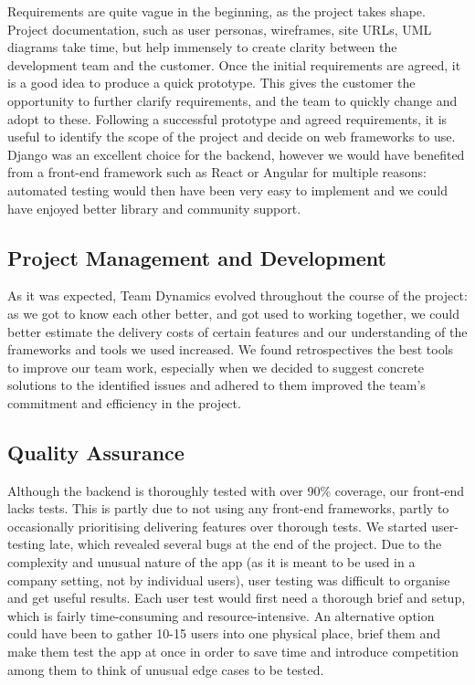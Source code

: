 \documentclass{l3proj}
\begin{document}
Requirements are quite vague in the beginning, as the project takes shape. Project documentation, such as user personas, wireframes, site URLs, UML diagrams take time, but help immensely to create clarity between the development team and the customer.
Once the initial requirements are agreed, it is a good idea to produce a quick prototype. This gives the customer the opportunity to further clarify requirements, and the team to quickly change and adopt to these. Following a successful prototype and agreed requirements, it is useful to identify the scope of the project and decide on web frameworks to use. Django was an excellent choice for the backend, however we would have benefited from a front-end framework such as React or Angular for multiple reasons: automated testing would then have been very easy to implement and we could have enjoyed better library and community support.


\subsection{Project Management and Development}

As it was expected, Team Dynamics evolved throughout the course of the project: as we got to know each other better, and got used to working together, we could better estimate the delivery costs of certain features and our understanding of the frameworks and tools we used increased. We found retrospectives the best tools to improve our team work, especially when we decided to suggest concrete solutions to the identified issues and adhered to them improved the team's commitment and efficiency in the project. 


\subsection{Quality Assurance}

Although the backend is thoroughly tested with over 90\% coverage, our front-end lacks tests. This is partly due to not using any front-end frameworks, partly to occasionally prioritising delivering features over thorough tests.
We started user-testing late, which revealed several bugs at the end of the project. Due to the complexity and unusual nature of the app (as it is meant to be used in a company setting, not by individual users), user testing was difficult to organise and get useful results. Each user test would first need a thorough brief and setup, which is fairly time-consuming and resource-intensive. An alternative option could have been to gather 10-15 users into one physical place, brief them and make them test the app at once in order to save time and introduce competition among them to think of unusual edge cases to be tested.
\end{document}
